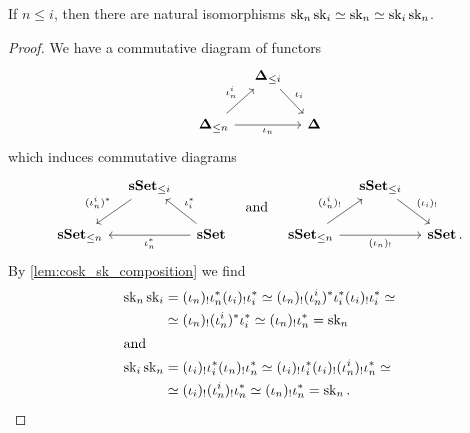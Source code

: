 \begin{lemma}\label{lem:sk-comp}
  If \(n\leq i\), then there are natural isomorphisms
  \(\operatorname{\textnormal{sk}}_n\operatorname{\textnormal{sk}}_i\simeq \operatorname{\textnormal{sk}}_n \simeq \operatorname{\textnormal{sk}}_i\operatorname{\textnormal{sk}}_n\).
\end{lemma}
\begin{proof}
We have a commutative diagram of functors
\[
  \begin{tikzcd}[column sep=1em]
    {} & \simplex_{\leq i} \arrow[rd, "\iota_i"] & {} \\
    \simplex_{\leq n} \arrow[ru, "\iota_n^i"] \arrow[rr, "\iota_n"'] & & \simplex
  \end{tikzcd}
\]
which induces commutative diagrams
\[
  \begin{tikzcd}[column sep=1em]
    {} & \sset_{\leq i} \arrow[dl, "(\iota_n^i)^{*}"'] & {} \\
    \sset_{\leq n} & & \sset \arrow[ul, "\iota_i^{*}"'] \arrow[ll, "\iota_n^{*}"]
  \end{tikzcd}\quad\text{and}\quad
  \begin{tikzcd}[column sep=1em]
    {} & \sset_{\leq i} \arrow[dr, "(\iota_i)_{!}"] & {} \\
    \sset_{\leq n} \arrow[ru, "(\iota_n^i)_{!}"] \arrow[rr, "(\iota_n)_{!}"'] & & \sset.
  \end{tikzcd}
\]
By \autoref{lem:cosk_sk_composition} we find
\begin{align*}
  \operatorname{\textnormal{sk}}_n\operatorname{\textnormal{sk}}_i &= (\iota_n)_{!}\iota_n^{*}(\iota_i)_{!}\iota_i^{*} \simeq
               (\iota_n)_{!}(\iota_n^i)^{*}\iota_i^{*}(\iota_i)_{!}\iota_i^{*} \simeq
  \\
             &\simeq (\iota_n)_{!}(\iota_{n}^i)^{*}\iota_i^{*}\simeq
               (\iota_n)_{!}\iota_n^{*} = \operatorname{\textnormal{sk}}_{n} \\
  \shortintertext{and}
  \operatorname{\textnormal{sk}}_i\operatorname{\textnormal{sk}}_n &= (\iota_i)_{!}\iota_i^{*}(\iota_n)_{!}\iota_n^{*}
               \simeq
               (\iota_i)_{!}\iota_i^{*}(\iota_i)_{!}(\iota_n^i)_{!}\iota_n^{*}
               \simeq \\
             &\simeq (\iota_i)_{!}(\iota_n^i)_{!}\iota_n^{*} \simeq
               (\iota_n)_{!}\iota_n^{*} = \operatorname{\textnormal{sk}}_n.\qedhere
\end{align*}
\end{proof}

